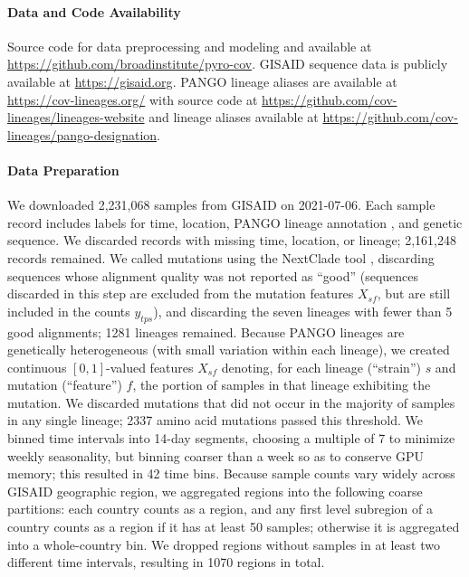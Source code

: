 \documentclass[12pt]{article}
\begin{document}
\paragraph*{Data and Code Availability}

Source code for data preprocessing and modeling and available at
\url{https://github.com/broadinstitute/pyro-cov}.
GISAID sequence data is publicly available at
\url{https://gisaid.org}.
PANGO lineage aliases are available at \url{https://cov-lineages.org/} with source code at \url{https://github.com/cov-lineages/lineages-website} and lineage aliases available at \url{https://github.com/cov-lineages/pango-designation}.

\paragraph*{Data Preparation}

We downloaded 2,231,068 samples from GISAID 
\cite{elbe2017gisaid} on 2021-07-06.
Each sample record includes labels for time, location, PANGO lineage annotation \cite{rambaut2020dynamic}, and genetic sequence.
We discarded records with missing time, location, or lineage; 2,161,248 records remained.
We called mutations using the NextClade tool \cite{aksamentov2020nextclade}, discarding sequences whose alignment quality was not reported as ``good'' (sequences discarded in this step are excluded from the mutation features $X_{sf}$, but are still included in the counts $y_{tps}$), and discarding the seven lineages with fewer than 5 good alignments; 1281 lineages remained.
Because PANGO lineages are genetically heterogeneous (with small variation within each lineage), we created continuous $[0, 1]$-valued features $X_{sf}$ denoting, for each lineage (``strain'') $s$ and mutation (``feature'') $f$, the portion of samples in that lineage exhibiting the mutation.
We discarded mutations that did not occur in the majority of samples in any single lineage; 2337 amino acid mutations passed this threshold.
We binned time intervals into 14-day segments, choosing a multiple of 7 to minimize weekly seasonality, but binning coarser than a week so as to conserve GPU memory; this resulted in 42 time bins.
Because sample counts vary widely across GISAID geographic region, we aggregated regions into the following coarse partitions: each country counts as a region, and any first level subregion of a country counts as a region if it has at least 50 samples; otherwise it is aggregated into a whole-country bin.
We dropped regions without samples in at least two different time intervals, resulting in 1070 regions in total.
\end{document}
